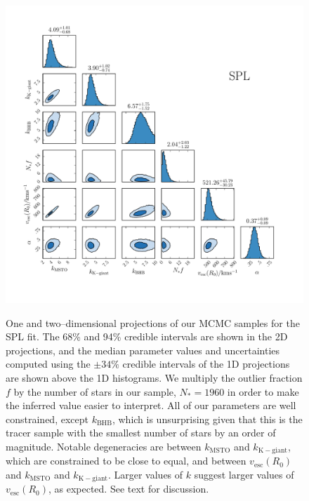 \documentclass[useAMS,twocolumn,usenatbib]{mn2e}
\def\vesc{{v_\mathrm{esc}}}
\begin{document}
\begin{figure}
\includegraphics[width=2\columnwidth]{plots/big_corner_spherical_powerlaw}\\
\caption{One and two--dimensional projections of our MCMC samples for the SPL fit. 
The 68\% and 94\% credible intervals are shown in the 2D projections, and the median parameter values and uncertainties computed using the $\pm 34\%$ credible intervals of the 1D projections are shown above the 1D histograms. 
We multiply the outlier fraction $f$ by the number of stars in our sample, $N_*=1960$ in order to make the inferred value easier to interpret.
All of our parameters are well constrained, except $k_\mathrm{BHB}$, which is unsurprising given that this is the tracer sample with the smallest number of stars by an order of magnitude. 
Notable degeneracies are between $k_\mathrm{MSTO}$ and $k_\mathrm{K-giant}$, which are constrained to be close to equal, {} and between $\vesc(R_0)$ and $k_\mathrm{MSTO}$ and $k_\mathrm{K-giant}$. 
Larger values of $k$ suggest larger values of $\vesc(R_0)$, as expected. 
See text for discussion.}
\label{fig:SPL_corner}
\end{figure}
\end{document}
